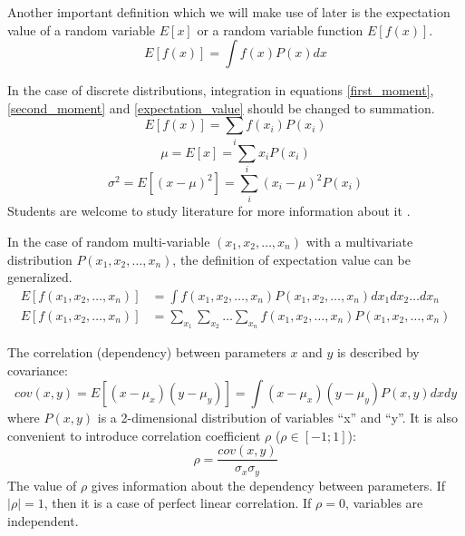 \documentclass[12pt,a4paper]{report}
\begin{document}
Another important definition which we will make use of later is the expectation value of a random variable $E[x]$ or a random variable function $E[f(x)]$.
\begin{equation} \label{expectation_value}
E[f(x)] =  \int f(x) P(x) dx
\end{equation}

In the case of discrete distributions, integration in equations \ref{first_moment}, \ref{second_moment} and \ref{expectation_value} should be changed to summation.
\begin{equation*}
E[f(x)] =  \sum_i f(x_i) P(x_i)
\end{equation*}
\begin{equation*}
\mu = E[x] = \sum_i x_i P(x_i)
\end{equation*}
\begin{equation*}
\sigma^2 = E[(x-\mu)^2] = \sum_i (x_i-\mu)^2P(x_i)
\end{equation*}
Students are welcome to study literature for more information about it \cite{stat_1, stat_2, stat_3}.

In the case of random multi-variable $(x_1,x_2,\dots,x_n)$ with a multivariate distribution $P(x_1,x_2,\dots,x_n)$, the definition of expectation value can be generalized.
\begin{align*}
E[f(x_1,x_2,\dots,x_n)] &=  \int f(x_1,x_2,\dots,x_n) P(x_1,x_2,\dots,x_n) dx_1 dx_2 \dots dx_n \\
E[f(x_1,x_2,\dots,x_n)] &=  \sum_{x_1} \sum_{x_2} \dots \sum_{x_n} f(x_1,x_2,\dots,x_n) P(x_1,x_2,\dots,x_n)
\end{align*}

The correlation (dependency) between parameters $x$ and $y$ is described by covariance:
\begin{equation*}
cov(x,y) = E[(x-\mu_x)(y-\mu_y)] = \int (x-\mu_x)(y-\mu_y)P(x,y)dxdy
\end{equation*}
where $P(x,y)$ is a 2-dimensional distribution of variables \enquote{x} and \enquote{y}. It is also convenient to introduce correlation coefficient $\rho$ ($\rho \in [-1; 1]$):
\begin{equation*}
\rho = \frac{cov(x,y)}{\sigma_x \sigma_y}
\end{equation*}
The value of $\rho$ gives information about the dependency between parameters. If $|\rho| = 1$, then it is a case of perfect linear correlation. If $\rho = 0$, variables are independent.
\end{document}
